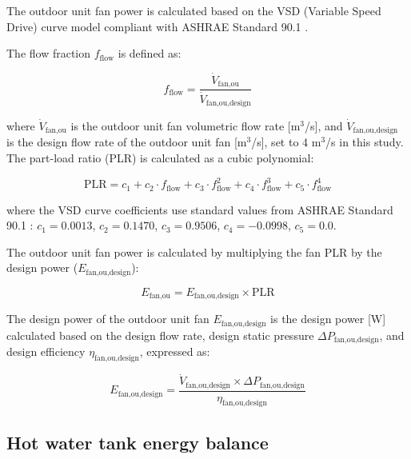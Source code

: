 \documentclass[letterpaper,10pt]{article}
\begin{document}
The outdoor unit fan power is calculated based on the VSD (Variable Speed Drive) curve model compliant with ASHRAE Standard 90.1 \cite{ashrae901_2022}.

The flow fraction $f_{\text{flow}}$ is defined as:

\begin{equation}
\label{eq:hpb_fan_flow_fraction}
f_{\text{flow}} = \frac{\dot{V}_{\text{fan,ou}}}{\dot{V}_{\text{fan,ou,design}}}
\end{equation}

where $\dot{V}_{\text{fan,ou}}$ is the outdoor unit fan volumetric flow rate [m$^3$/s], and $\dot{V}_{\text{fan,ou,design}}$ is the design flow rate of the outdoor unit fan [m$^3$/s], set to 4 m$^3$/s in this study. The part-load ratio (PLR) is calculated as a cubic polynomial:

\begin{equation}
\label{eq:hpb_fan_plr}
\text{PLR} = c_1 + c_2 \cdot f_{\text{flow}} + c_3 \cdot f_{\text{flow}}^2 + c_4 \cdot f_{\text{flow}}^3 + c_5 \cdot f_{\text{flow}}^4
\end{equation}

where the VSD curve coefficients use standard values from ASHRAE Standard 90.1 \cite{ashrae901_2022}: $c_1 = 0.0013$, $c_2 = 0.1470$, $c_3 = 0.9506$, $c_4 = -0.0998$, $c_5 = 0.0$.

The outdoor unit fan power is calculated by multiplying the fan PLR by the design power ($E_{\text{fan,ou,design}}$):

\begin{equation}
\label{eq:hpb_e_fan}
E_{\text{fan,ou}} = E_{\text{fan,ou,design}} \times \text{PLR}
\end{equation}

The design power of the outdoor unit fan $E_{\text{fan,ou,design}}$ is the design power [W] calculated based on the design flow rate, design static pressure $\Delta P_{\text{fan,ou,design}}$, and design efficiency $\eta_{\text{fan,ou,design}}$, expressed as:

\begin{equation}
\label{eq:hpb_fan_design_power}
E_{\text{fan,ou,design}} = \frac{\dot{V}_{\text{fan,ou,design}} \times \Delta P_{\text{fan,ou,design}}}{\eta_{\text{fan,ou,design}}}
\end{equation}

\subsection{Hot water tank energy balance}
\end{document}
